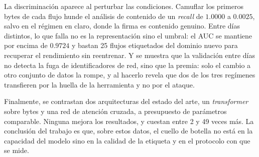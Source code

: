 La discriminación aparece al perturbar las condiciones. Camuflar los primeros
bytes de cada flujo hunde el análisis de contenido de un \emph{recall} de
$1.0000$ a $0.0025$, salvo en el régimen en claro, donde la firma es
contenido genuino. Entre días distintos, lo que falla no es la representación
sino el umbral: el AUC se mantiene por encima de $0.9724$ y bastan 25 flujos
etiquetados del dominio nuevo para recuperar el rendimiento sin reentrenar. Y se
muestra que la validación entre días no detecta la fuga de identificadores de
red, sino que la premia: solo el cambio a otro conjunto de datos la rompe, y al
hacerlo revela que dos de los tres regímenes transfieren por la huella de la
herramienta y no por el ataque.

Finalmente, se contrastan dos arquitecturas del estado del arte, un
\emph{transformer} sobre bytes y una red de atención cruzada, a presupuesto de
parámetros comparable. Ninguna mejora los resultados, y cuestan entre 2 y 49
veces más. La conclusión del trabajo es que, sobre estos datos, el cuello de
botella no está en la capacidad del modelo sino en la calidad de la etiqueta y
en el protocolo con que se mide.
